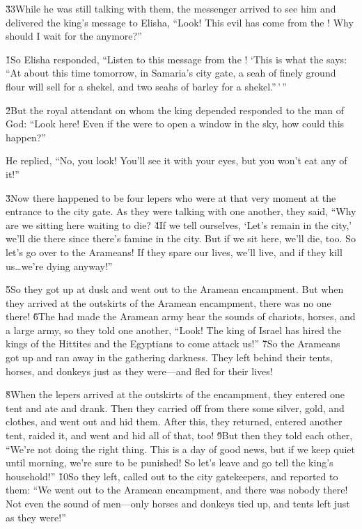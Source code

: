 \v{33}While he was still talking with them, the messenger arrived to see him and delivered the king's message to Elisha, ``Look! This evil has come from the ! Why should I wait for the  anymore?''

\v{1}So Elisha responded, ``Listen to this message from the ! `This is what the  says: ``At about this time tomorrow, in Samaria's city gate, a seah of finely ground flour will sell for a shekel, and two seahs of barley for a shekel.''\,'\,''

\v{2}But the royal attendant on whom the king depended responded to the man of God: ``Look here! Even if the  were to open a window in the sky, how could this happen?''

He replied, ``No, you look! You'll see it with your eyes, but you won't eat any of it!''

\v{3}Now there happened to be four lepers who were at that very moment at the entrance to the city gate. As they were talking with one another, they said, ``Why are we sitting here waiting to die? \v{4}If we tell ourselves, `Let's remain in the city,' we'll die there since there's famine in the city. But if we sit here, we'll die, too. So let's go over to the Arameans! If they spare our lives, we'll live, and if they kill us{\ldots}we're dying anyway!''

\v{5}So they got up at dusk and went out to the Aramean encampment. But when they arrived at the outskirts of the Aramean encampment, there was no one there! \v{6}The  had made the Aramean army hear the sounds of chariots, horses, and a large army, so they told one another, ``Look! The king of Israel has hired the kings of the Hittites and the Egyptians to come attack us!'' \v{7}So the Arameans got up and ran away in the gathering darkness. They left behind their tents, horses, and donkeys just as they were---and fled for their lives!

\v{8}When the lepers arrived at the outskirts of the encampment, they entered one tent and ate and drank. Then they carried off from there some silver, gold, and clothes, and went out and hid them. After this, they returned, entered another tent, raided it, and went and hid all of that, too! \v{9}But then they told each other, ``We're not doing the right thing. This is a day of good news, but if we keep quiet until morning, we're sure to be punished! So let's leave and go tell the king's household!'' \v{10}So they left, called out to the city gatekeepers, and reported to them: ``We went out to the Aramean encampment, and there was nobody there! Not even the sound of men---only horses and donkeys tied up, and tents left just as they were!''

